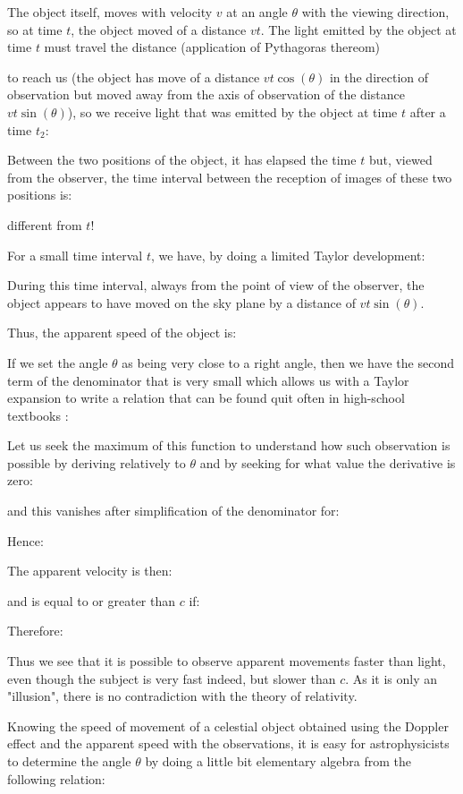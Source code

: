 	The object itself, moves with velocity $v$ at an angle $\theta$ with the viewing direction, so at time $t$, the object moved of a distance $vt$. The light emitted by the object at time $t$ must travel the distance (application of Pythagoras thereom)
	
	to reach us (the object has move of a distance $vt\cos(\theta)$ in the direction of observation but moved away from the axis of observation of the distance $vt\sin(\theta)$), so we receive light that was emitted by the object at time $t$ after a time $t_2$:
	
	Between the two positions of the object, it has elapsed the time $t$ but, viewed from the observer, the time interval between the reception of images of these two positions is:
	
	different from $t$!
	
	For a small time interval $t$, we have, by doing a limited Taylor development:
	
	During this time interval, always from the point of view of the observer, the object appears to have moved on the sky plane by a distance of $vt\sin(\theta)$.

	Thus, the apparent speed of the object is:
	
	If we set the angle $\theta$ as being very close to a right angle, then we have the second term of the denominator that is very small which allows us with a Taylor expansion to write a relation that can be found quit often in high-school textbooks :
	
	Let us seek the maximum of this function to understand how such observation is possible by deriving relatively to $\theta$ and by seeking for what value the derivative is zero:
	
	and this vanishes after simplification of the denominator for:
	
	Hence:
	
	The apparent velocity is then:
	
	and is equal to or greater than $c$ if:
	
	Therefore:
	
	Thus we see that it is possible to observe apparent movements faster than light, even though the subject is very fast indeed, but slower than $c$. As it is only an "illusion", there is no contradiction with the theory of relativity.

	Knowing the speed of movement of a celestial object obtained using the Doppler effect and the apparent speed with the observations, it is easy for astrophysicists to determine the angle  $\theta$ by doing a little bit elementary algebra from the following relation:
	
